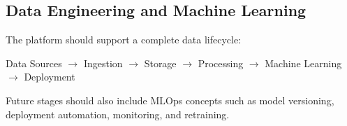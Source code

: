 \subsection{Data Engineering and Machine Learning}

The platform should support a complete data lifecycle:

\begin{center}
Data Sources $\rightarrow$ Ingestion $\rightarrow$ Storage
$\rightarrow$ Processing $\rightarrow$ Machine Learning
$\rightarrow$ Deployment
\end{center}

Future stages should also include MLOps concepts such as model versioning,
deployment automation, monitoring, and retraining.